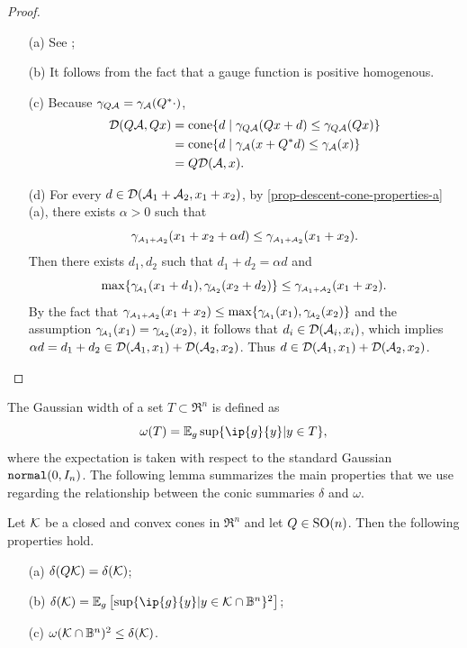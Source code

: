 \begin{proof}
    \leavevmode
      \begin{itemize}
        \item[(a)] See \cite[Proposition 2.5]{mccoy2014sharp};
        \item[(b)] It follows from the fact that a gauge function is positive homogenous.  
        \item[(c)] Because $\gamma_{Q\mathcal{A}}=\gamma_{\mathcal{A}}(Q^*\cdot)$,
        \begin{align*}
          \mathcal{D}(Q\mathcal{A}, Qx) &= \operatorname{cone}\{d \mid \gamma_{Q\mathcal{A}}(Qx + d) \leq \gamma_{Q\mathcal{A}}(Qx)\}
          \\&= \operatorname{cone}\{d \mid \gamma_{\mathcal{A}}(x + Q^*d) \leq \gamma_{\mathcal{A}}(x)\}
          \\&= Q\mathcal{D}(\mathcal{A}, x).
        \end{align*}
        \item[(d)] 
        For every $d \in \mathcal{D}(\mathcal{A}_1 + \mathcal{A}_2, x_1 + x_2)$, by \autoref{prop-descent-cone-properties-a}(a), there exists $\alpha > 0$ such that  
        \[\gamma_{\scriptscriptstyle\mathcal{A}_1 + \scriptscriptstyle\mathcal{A}_2}(x_1 + x_2 + \alpha d) \leq \gamma_{\scriptscriptstyle\mathcal{A}_1 + \scriptscriptstyle\mathcal{A}_2}(x_1 + x_2).\] 
        Then there exists $d_1, d_2$ such that $d_1 + d_2 = \alpha d$ and 
        \[\max\{\gamma_{\!\scriptscriptstyle\mathcal{A}_1}(x_1 + d_1), \gamma_{\!\scriptscriptstyle\mathcal{A}_2}(x_2 + d_2)\} \leq \gamma_{\scriptscriptstyle\mathcal{A}_1 + \scriptscriptstyle\mathcal{A}_2}(x_1 + x_2).\]
        By the fact that $\gamma_{\scriptscriptstyle\mathcal{A}_1 + \scriptscriptstyle\mathcal{A}_2}(x_1 + x_2) \leq \max\{\gamma_{\!\scriptscriptstyle\mathcal{A}_1}(x_1), \gamma_{\!\scriptscriptstyle\mathcal{A}_2}(x_2)\}$ and the assumption $\gamma_{\!\scriptscriptstyle\mathcal{A}_1}(x_1) = \gamma_{\!\scriptscriptstyle\mathcal{A}_2}(x_2)$, it follows that $d_i \in \mathcal{D}(\mathcal{A}_i, x_i)$, which implies $\alpha d = d_1 + d_2 \in \mathcal{D}(\mathcal{A}_1, x_1) + \mathcal{D}(\mathcal{A}_2, x_2)$. Thus $d \in \mathcal{D}(\mathcal{A}_1, x_1) + \mathcal{D}(\mathcal{A}_2, x_2)$.
      \end{itemize}
\end{proof}

The Gaussian width of a set $T \subset \Re^n$ is defined as
\[\omega(T) = \mE_{g} \sup\{ \ip{g}{y} | y\in T\},\]
where the expectation is taken with respect to the standard Gaussian $\operatorname{\texttt{normal}}(0,I_n)$. 
The following lemma summarizes the main properties that we use regarding the relationship between the conic summaries $\delta$ and $\omega$.

\begin{lemma}\label{prop:stat_dim}
    Let $\mathcal{K}$ be a closed and convex cones in $\Re^n$ and let $Q\in\operatorname{SO}(n)$. Then the following properties hold. 
    \begin{itemize}
      \item[(a)] \label{prop:stat_dim_a} $\delta(Q\mathcal{K}) = \delta(\mathcal{K})$;
      \item[(b)] \label{prop:stat_dim_b} $\delta(\Kscr) = \mE_g \left[\sup\{ \ip{g}{y} | y\in\Kscr\cap\mB^n\}^2\right]$;
      \item[(c)] \label{prop:stat_dim_c} $\omega(\mathcal{K}\cap\mathbb{B}^n)^2 \leq \delta(\mathcal{K})$.
    \end{itemize}
\end{lemma}

